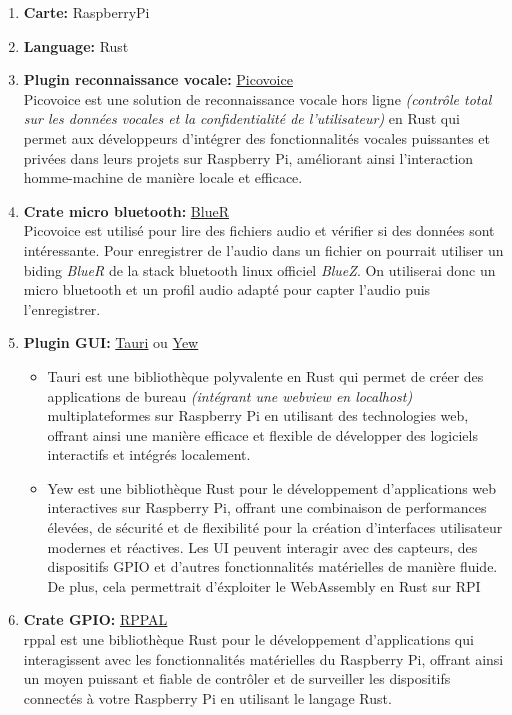\begin{enumerate}
    \item \textbf{Carte:} RaspberryPi 
    \item \textbf{Language:} Rust 
    \item \textbf{Plugin reconnaissance vocale:} \href{https://picovoice.ai/}{Picovoice} \\
            Picovoice est une solution de reconnaissance vocale hors ligne \textit{(contrôle total sur les données vocales et la confidentialité de l'utilisateur)} en Rust qui permet aux développeurs d'intégrer 
            des fonctionnalités vocales puissantes et privées dans leurs projets sur Raspberry Pi, améliorant ainsi l'interaction homme-machine de manière locale et efficace. 

    \item \textbf{Crate micro bluetooth:} \href{https://crates.io/crates/bluer}{BlueR} \\
            Picovoice est utilisé pour lire des fichiers audio et vérifier si des données sont intéressante. Pour enregistrer de l'audio dans un fichier
            on pourrait utiliser un biding \textit{BlueR} de la stack bluetooth linux officiel \textit{BlueZ}. On utiliserai donc un micro bluetooth et un profil
            audio adapté pour capter l'audio puis l'enregistrer.

    \item \textbf{Plugin GUI:} \href{https://tauri.app/}{Tauri} ou \href{https://yew.rs/}{Yew}

        \begin{itemize}
            \item Tauri est une bibliothèque polyvalente en Rust qui permet de créer des applications de bureau \textit{(intégrant une webview en localhost)}
            multiplateformes sur Raspberry Pi en utilisant des technologies web, offrant ainsi une manière efficace et flexible de développer des logiciels interactifs et intégrés localement.

            \item  Yew est une bibliothèque Rust pour le développement d'applications web interactives sur Raspberry Pi, 
            offrant une combinaison de performances élevées, de sécurité et de flexibilité pour la création d'interfaces utilisateur modernes et réactives. Les UI peuvent interagir avec des capteurs, des dispositifs GPIO et d'autres fonctionnalités matérielles de manière fluide.
            De plus, cela permettrait d'éxploiter le WebAssembly en Rust sur RPI 
        \end{itemize}


    \item \textbf{Crate GPIO:} \href{https://github.com/golemparts/rppal}{RPPAL} \\
    rppal est une bibliothèque Rust pour le développement d'applications qui interagissent avec les fonctionnalités matérielles du Raspberry Pi, offrant ainsi 
    un moyen puissant et fiable de contrôler et de surveiller les dispositifs connectés à votre Raspberry Pi en utilisant le langage Rust.
\end{enumerate}

